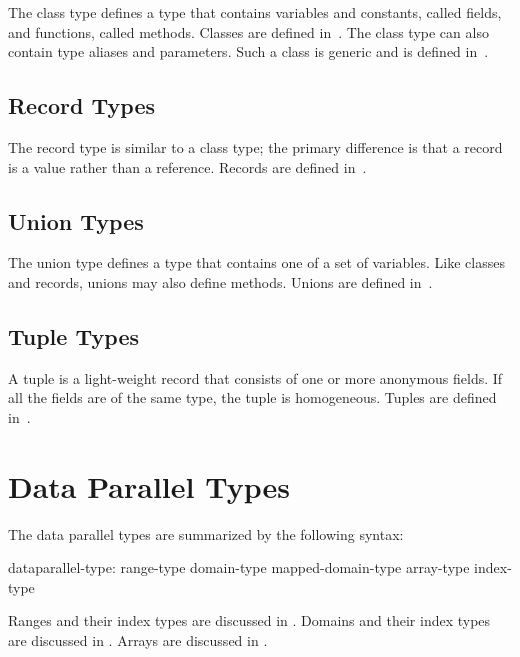 The class type defines a type that contains variables and constants,
called fields, and functions, called methods.  Classes are defined
in~.  The class type can also contain type aliases and
parameters.  Such a class is generic and is defined
in~.

\subsection{Record Types}
\label{Types_Record_Types}

The record type is similar to a class type; the primary difference is
that a record is a value rather than a reference.  Records are defined
in~.

\subsection{Union Types}
\label{Types_Union_Types}

The union type defines a type that contains one of a set of variables.
Like classes and records, unions may also define methods.  Unions are
defined in~.

\subsection{Tuple Types}
\label{Types_Tuple_Types}

A tuple is a light-weight record that consists of one or more
anonymous fields.  If all the fields are of the same type, the tuple
is homogeneous.  Tuples are defined in~.

\clearpage
\section{Data Parallel Types}
\label{Data_Parallel_Types}

The data parallel types are summarized by the following syntax:

\begin{syntax}
dataparallel-type:
  range-type
  domain-type
  mapped-domain-type
  array-type
  index-type
\end{syntax}

Ranges and their index types are discussed in .
Domains and their index types are discussed in .
Arrays are discussed in .

